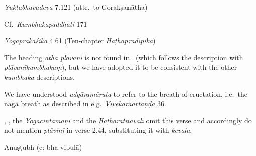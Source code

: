 \begin{ekdosis}
\begin{testimonia}[hp02_071]
\emph{Yuktabhavadeva} 7.121 (attr.~to Gorakṣanātha)

\begin{versinnote}
\end{versinnote}

Cf.~\emph{Kumbhakapaddhati} 171

\begin{versinnote}
\end{versinnote}

\emph{Yogaprakāśikā} 4.61 (Ten-chapter \emph{Haṭhapradīpikā})

\begin{versinnote}
\end{versinnote}
\end{testimonia}

\begin{philcomm}[hp02_071]
The heading \emph{atha plāvanī} is not found in \alphaOne \ (which follows the description with \emph{plāvanīkumbhakaṃ}), but we have adopted it to be consistent with the other \emph{kumbhaka} descriptions.

We have understood \emph{udgāramāruta} to refer to the breath of eructation, i.e.~the nāga breath as described in e.g.~\emph{Vivekamārtaṇḍa} 36.

, , the \emph{Yogacintāmaṇi} and the \emph{Haṭharatnāvalī} omit this verse and accordingly do not mention \emph{plāvinī} in verse 2.44, substituting it with \emph{kevala}.

\end{philcomm}

\begin{metre}[hp02_071]
Anuṣṭubh (c: bha-vipulā)
\end{metre}


\end{ekdosis}

